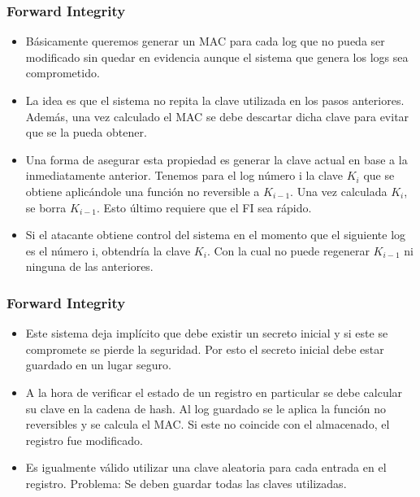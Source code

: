 \documentclass[10pt, a4paper,english,spanish]{beamer}
\begin{document}
\begin{frame}
\frametitle{Forward Integrity}
\begin{itemize}
\item Básicamente queremos generar un MAC para cada log que no pueda ser modificado sin quedar en evidencia
aunque el sistema que genera los logs sea comprometido.
\item La idea es que el sistema no repita la clave utilizada en los pasos anteriores. Además, una vez calculado
el MAC se debe descartar dicha clave para evitar que se la pueda obtener.
\item Una forma de asegurar esta propiedad es generar la clave actual en base a la inmediatamente anterior.
Tenemos para el log número i la clave $K_{i}$ que se obtiene aplicándole una función no reversible a
$K_{i-1}$. Una vez calculada $K_{i}$, se borra $K_{i-1}$. Esto último requiere que el FI sea rápido.
\item Si el atacante obtiene control del sistema en el momento que el siguiente log es el número i,
obtendría la clave $K_{i}$. Con la cual no puede regenerar $K_{i-1}$ ni ninguna de las anteriores.
\end{itemize}
\end{frame}


\begin{frame}
\frametitle{Forward Integrity}
\begin{itemize}
\item Este sistema deja implícito que debe existir un secreto inicial y si este se compromete se pierde la
seguridad. Por esto el secreto inicial debe estar guardado en un lugar seguro.
\item A la hora de verificar el estado de un registro en particular se debe calcular su clave en la cadena de hash.
Al log guardado se le aplica la función no reversibles y se calcula el MAC. Si este no coincide con el almacenado,
el registro fue modificado.
\item Es igualmente válido utilizar una clave aleatoria para cada entrada en el registro. Problema:
Se deben guardar todas las claves utilizadas.

\end{itemize}
\end{frame}
\end{document}
